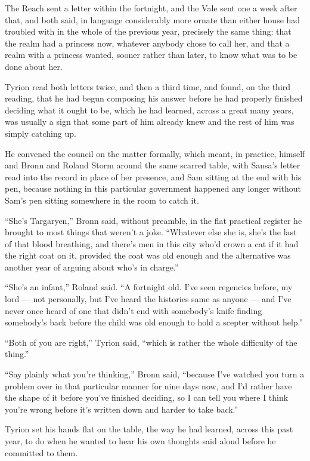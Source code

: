 The Reach sent a letter within the fortnight, and the Vale sent one a week after that, and both said, in language considerably more ornate than either house had troubled with in the whole of the previous year, precisely the same thing: that the realm had a princess now, whatever anybody chose to call her, and that a realm with a princess wanted, sooner rather than later, to know what was to be done about her.

Tyrion read both letters twice, and then a third time, and found, on the third reading, that he had begun composing his answer before he had properly finished deciding what it ought to be, which he had learned, across a great many years, was usually a sign that some part of him already knew and the rest of him was simply catching up.

\sceneBreak

He convened the council on the matter formally, which meant, in practice, himself and Bronn and Roland Storm around the same scarred table, with Sansa’s letter read into the record in place of her presence, and Sam sitting at the end with his pen, because nothing in this particular government happened any longer without Sam’s pen sitting somewhere in the room to catch it.

“She’s Targaryen,” Bronn said, without preamble, in the flat practical register he brought to most things that weren’t a joke. “Whatever else she is, she’s the last of that blood breathing, and there’s men in this city who’d crown a cat if it had the right coat on it, provided the coat was old enough and the alternative was another year of arguing about who’s in charge.”

“She’s an infant,” Roland said. “A fortnight old. I’ve seen regencies before, my lord — not personally, but I’ve heard the histories same as anyone — and I’ve never once heard of one that didn’t end with somebody’s knife finding somebody’s back before the child was old enough to hold a scepter without help.”

“Both of you are right,” Tyrion said, “which is rather the whole difficulty of the thing.”

\sceneBreak

“Say plainly what you’re thinking,” Bronn said, “because I’ve watched you turn a problem over in that particular manner for nine days now, and I’d rather have the shape of it before you’ve finished deciding, so I can tell you where I think you’re wrong before it’s written down and harder to take back.”

Tyrion set his hands flat on the table, the way he had learned, across this past year, to do when he wanted to hear his own thoughts said aloud before he committed to them.

